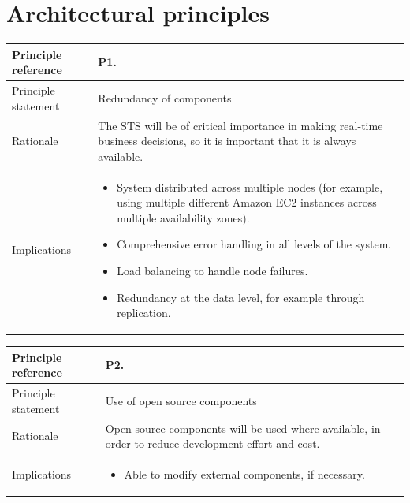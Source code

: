 \documentclass[a4paper,11pt]{report}
\begin{document}
\section{Architectural principles}
\label{sec:arch-princ}

\begin{center}
  \begin{tabular}[h!]{| >{\columncolor{gray}}p{} | p{} |}
    \hline
    Principle reference & P1. \\
    \hline
    Principle statement & Redundancy of components \\
    \hline
    Rationale & The STS will be of critical importance in making real-time business decisions, so it is important that it is always available. \\
    \hline
    Implications & \begin{itemize}
      \item System distributed across multiple nodes (for example, using multiple different Amazon EC2 instances across multiple availability zones).
      \item Comprehensive error handling in all levels of the system.
      \item Load balancing to handle node failures.
      \item Redundancy at the data level, for example through replication.
      \end{itemize}
        \\
    \hline
  \end{tabular}
\end{center}
\begin{center}
  \begin{tabular}[h!]{| >{\columncolor{gray}}p{} | p{} |}
    \hline
    Principle reference & P2. \\
    \hline
    Principle statement & Use of open source components \\
    \hline
    Rationale & Open source components will be used where available, in order to reduce development effort and cost. \\
    \hline
    Implications & \begin{itemize}
      \item Able to modify external components, if necessary.
      \end{itemize}
        \\
    \hline
  \end{tabular}
\end{center}
\end{document}
